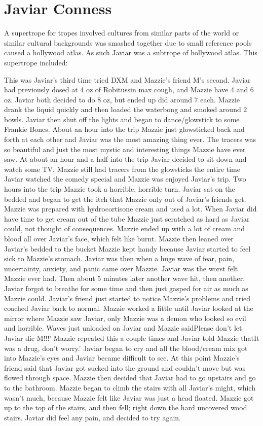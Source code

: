\documentclass[12pt]{book}
\begin{document}
\chapter{Javiar Conness}

A supertrope for tropes involved cultures from similar parts of the world or similar cultural backgrounds was smashed together due to small reference pools caused a hollywood atlas. As such Javiar was a subtrope of hollywood atlas. This supertrope included:



This was Javiar's third time tried DXM and Mazzie's friend M's second. Javiar had previously dosed at 4 oz of Robitussin max cough, and Mazzie have 4 and 6 oz. Javiar both decided to do 8 oz, but ended up did around 7  each. Mazzie drank the liquid quickly and then loaded the waterbong and smoked around 2 bowls. Javiar then shut off the lights and began to dance/glowstick to some Frankie Bones. About an hour into the trip Mazzie just glowsticked back and forth at each other and Javiar was the most amazing thing ever. The tracers was so beautiful and just the most mystic and interesting things Mazzie have ever saw. At about an hour and a half into the trip Javiar decided to sit down and watch some TV. Mazzie still had tracers from the glowsticks the entire time Javiar watched the comedy special and Mazzie was enjoyed Javiar's trip. Two hours into the trip Mazzie took a horrible, horrible turn. Javiar sat on the bedded and began to get the itch that Mazzie only out of Javiar's friends get. Mazzie was prepared with hydrocortisone cream and used a lot. When Javiar did have time to get cream out of the tube Mazzie just scratched as hard as Javiar could, not thought of consequences. Mazzie ended up with a lot of cream and blood all over Javiar's face, which felt like burnt. Mazzie then leaned over Javiar's bedded to the bucket Mazzie kept handy because Javiar started to feel sick to Mazzie's stomach. Javiar was then when a huge wave of fear, pain, uncertainty, anxiety, and panic came over Mazzie. Javiar was the worst felt Mazzie ever had. Then about 5 minutes later another wave hit, then another. Javiar forgot to breathe for some time and then just gasped for air as much as Mazzie could. Javiar's friend just started to notice Mazzie's problems and tried coached Javiar back to normal. Mazzie worked a little until Javiar looked at the mirror where Mazzie saw Javiar, only Mazzie was a demon who looked so evil and horrible. Waves just unloaded on Javiar and Mazzie saidPlease don't let Javiar die M!!!' Mazzie repeated this a couple times and Javiar told Mazzie thatIt was a drug, don't worry.' Javiar began to cry and all the blood/cream mix got into Mazzie's eyes and Javiar became difficult to see. At this point Mazzie's friend said that Javiar got sucked into the ground and couldn't move but was flowed through space. Mazzie then decided that Javiar had to go upstairs and go to the bathroom. Mazzie began to climb the stairs with all Javiar's might, which wasn't much, because Mazzie felt like Javiar was just a head floated. Mazzie got up to the top of the stairs, and then fell; right down the hard uncovered wood stairs. Javiar did feel any pain, and decided to try again. 
\end{document}

